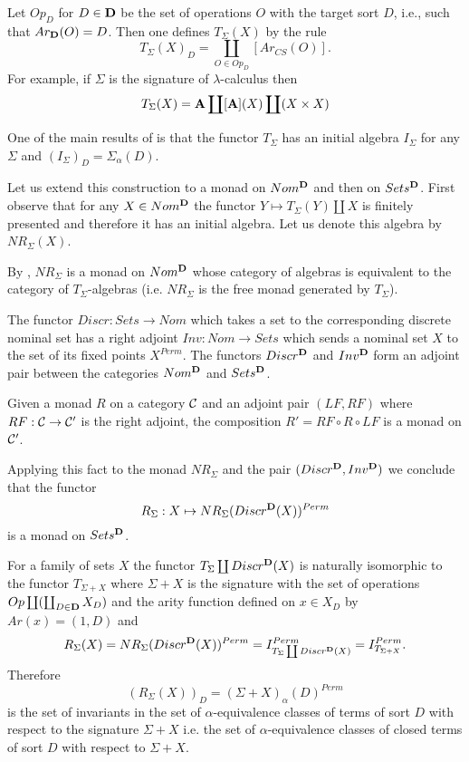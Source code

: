 \documentclass[11pt]{article}
\newcommand{\sr}{\rightarrow}
\begin{document}
Let $Op_D$ for $D\in {\bf D}$ be the set of operations $O$ with the target sort $D$, i.e., such that $Ar_{\bf D}(O)=D$.  Then one defines $T_{\Sigma}(X)$ by the rule
%
$$T_{\Sigma}(X)_D=\coprod_{O\in Op_D} [Ar_{CS}(O)].$$
%
For example, if $\Sigma$ is the signature of $\lambda$-calculus then 
%
$$T_{\Sigma}(X)={\bf A}\coprod [{\bf A}](X)\coprod (X\times X)$$
%

One of the main results of \cite{Pitts} is that the functor $T_{\Sigma}$ has an initial algebra $I_{\Sigma}$ for any $\Sigma$ and $(I_{\Sigma})_D=\Sigma_{\alpha}(D)$. 

Let us extend this construction to a monad on $Nom^{\bf D}$ and then on $Sets^{\bf D}$. First observe that for any $X\in Nom^{\bf D}$ the functor $Y\mapsto T_{\Sigma}(Y)\coprod X$ is finitely presented and therefore it has an initial algebra. Let us denote this algebra by $NR_{\Sigma}(X)$. 

By \cite[pp. 243-244]{Awodey2010}, $NR_{\Sigma}$ is a monad on $Nom^{\bf D}$ whose category of algebras is equivalent to the category of $T_{\Sigma}$-algebras (i.e. $NR_{\Sigma}$ is the free monad generated by $T_{\Sigma}$).

The functor $Discr:Sets \sr Nom$ which takes a set to the corresponding discrete nominal set has a right adjoint $Inv:Nom\sr Sets$ which sends a nominal set $X$ to the set of its fixed points $X^{Perm}$. The functors $Discr^{\bf D}$ and $Inv^{\bf D}$ form an adjoint pair between the categories $Nom^{\bf D}$ and $Sets^{\bf D}$.

Given a monad $R$ on a category $\cal C$ and an adjoint pair $(LF,RF)$ where $RF:{\cal C}\sr{\cal C}'$ is the right adjoint, the composition $R'=RF\circ R\circ LF$ is a monad on ${\cal C}'$.

Applying this fact to the monad $NR_{\Sigma}$ and the pair $(Discr^{\bf D},Inv^{\bf D})$ we conclude that the functor 
%
$$R_{\Sigma}:X\mapsto NR_{\Sigma}(Discr^{\bf D}(X))^{Perm}$$
% 
is a monad on $Sets^{\bf D}$.

For a family of sets $X$ the functor $T_{\Sigma}\coprod Discr^{\bf D}(X)$ is naturally isomorphic to the functor $T_{\Sigma+X}$ where $\Sigma+X$ is the signature with the set of operations $Op\coprod (\coprod_{D\in {\bf D}} X_D)$ and the arity function defined on $x\in X_D$ by $Ar(x)=(1,D)$ and
%
$$R_{\Sigma}(X)=NR_{\Sigma}(Discr^{\bf D}(X))^{Perm}=I_{T_{\Sigma}\coprod Discr^{\bf D}(X)}^{Perm}=I_{T_{\Sigma+X}}^{Perm}.$$
%
Therefore
%
$$(R_{\Sigma}(X))_D=(\Sigma+X)_{\alpha}(D)^{Perm}$$
%
is the set of invariants in the set of $\alpha$-equivalence classes of terms of sort $D$ with respect to the signature $\Sigma+X$ i.e. the set of $\alpha$-equivalence classes of closed terms of sort $D$ with respect to $\Sigma+X$. 
\end{document}
